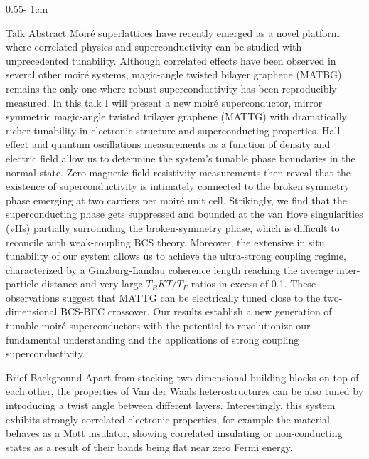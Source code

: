 \documentclass{../psuposter}
\begin{document}
\begin{frame}
\begin{columns}[t, totalwidth=\textwidth]
\begin{column}{0.55\textwidth - 1cm}
    \begin{block}{Talk Abstract}
    	Moiré superlattices have recently emerged as a novel platform where correlated physics and superconductivity can be studied with unprecedented tunability. Although correlated effects have been observed in several other moiré systems, magic-angle twisted bilayer graphene (MATBG) remains the only one where robust superconductivity has been reproducibly measured. In this talk I will present a new moiré superconductor, mirror symmetric magic-angle twisted trilayer graphene (MATTG) with dramatically richer tunability in electronic structure and superconducting properties. Hall effect and quantum oscillations measurements as a function of density and electric field allow us to determine the system's tunable phase boundaries in the normal state. Zero magnetic field resistivity measurements then reveal that the existence of superconductivity is intimately connected to the broken symmetry phase emerging at two carriers per moiré unit cell. Strikingly, we find that the superconducting phase gets suppressed and bounded at the van Hove singularities (vHs) partially surrounding the broken-symmetry phase, which is difficult to reconcile with weak-coupling BCS theory. Moreover, the extensive in situ tunability of our system allows us to achieve the ultra-strong coupling regime, characterized by a Ginzburg-Landau coherence length reaching the average inter-particle distance and very large $T_BKT/T_F$ ratios in excess of 0.1. These observations suggest that MATTG can be electrically tuned close to the two-dimensional BCS-BEC crossover. Our results establish a new generation of tunable moiré superconductors with the potential to revolutionize our fundamental understanding and the applications of strong coupling superconductivity.
    \end{block}


    \begin{block}{Brief Background}
    	Apart from stacking two-dimensional building blocks on top of each other, the properties of Van der Waals heterostructures can be also tuned by introducing a twist angle between different layers. Interestingly, this system exhibits strongly correlated electronic properties, for example the material behaves as a Mott insulator, showing correlated insulating or non-conducting states as a result of their bands being flat near zero Fermi energy. \cite{caoSuperlatticeInducedInsulatingStates2016} \cite{caoUnconventionalSuperconductivityMagicangle2018}


\end{block}
\end{column}
\end{columns}
\end{frame}
\end{document}
